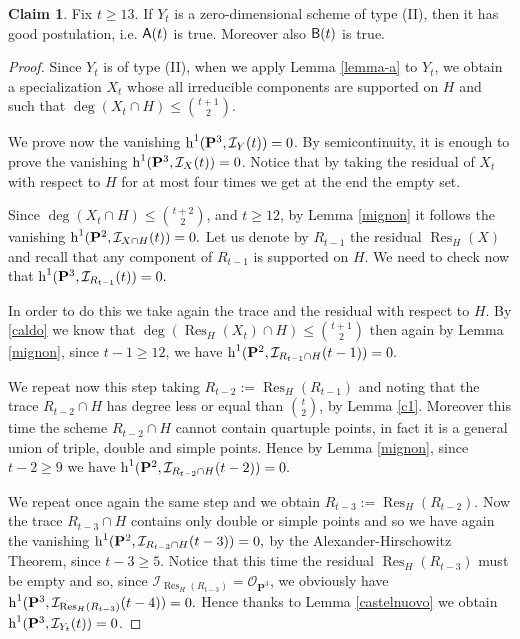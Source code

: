 \documentclass{amsart}
\theoremstyle{plain}
\theoremstyle{definition}
\newtheorem{claim}[theorem]{Claim}
\begin{document}
\begin{claim}\label{claim-a0}
Fix $t\ge13$.
If $Y_t$ is a zero-dimensional scheme of type (II), then
it has good postulation, i.e. ${\sf{{A}}}(t)$ is true.  Moreover also ${\sf{B}}(t)$ is true.
\end{claim}

\begin{proof}
Since $Y_t$ is of type (II),
when we apply Lemma \ref{lemma-a} to $Y_t$, we obtain a
specialization $X_t$ whose all irreducible components are supported on
$H$ and such that $\deg(X_t\cap H)\leq\binom{t+1}{2}$.

We prove now the vanishing $\operatorname{h}^1({\bf{P}}^3,\mathcal {I}_Y(t)) = 0$.
By semicontinuity, it is enough to prove the
vanishing
$\operatorname{h}^1({\bf{P}}^3,\mathcal {I}_X(t)) = 0$.
Notice that by taking the residual of $X_t$ with respect to $H$ for at most
four times we get at the end the empty set.

Since $\deg(X_t\cap H)\le\binom{t+2}{2}$, and $t\ge12$,
by Lemma \ref{mignon} it follows the vanishing
$\operatorname{h}^1({\bf{P}}^2,\mathcal{I}_{X\cap H}(t)) = 0.$
Let us denote by $R_{t-1}$ the residual $\operatorname{Res}_H(X)$ and recall that
any component of $R_{t-1}$ is supported on $H$.
We need to check now that
$\operatorname{h}^1({\bf{P}}^3,\mathcal{I}_{R_{t-1}}(t)) = 0.$

In order to do this
we take again the trace and the residual with respect to $H$.
By \eqref{caldo} we know that
$\deg(\operatorname{Res}_H(X_t)\cap H)\leq\binom{t+1}{2}$
then again by Lemma \ref{mignon}, since $t-1\ge12$, we have
$\operatorname{h}^1({\bf{P}}^2,\mathcal{I}_{R_{t-1}\cap H}(t-1)) = 0.$

We repeat now this step taking $R_{t-2}:=\operatorname{Res}_H(R_{t-1})$ and noting
that the trace $R_{t-2}\cap H$ has degree less or equal than
$\binom{t}{2}$, by Lemma \ref{c1}.
Moreover this time the scheme $R_{t-2}\cap H$ cannot contain quartuple
points,
in fact it is a general union of triple, double and simple points.
Hence by Lemma \ref{mignon}, since $t-2\ge9$ we have
$\operatorname{h}^1({\bf{P}}^2,\mathcal{I}_{R_{t-2}\cap H}(t-2)) = 0.$

We repeat once again the same step and we obtain
$R_{t-3}:=\operatorname{Res}_H(R_{t-2})$. Now the trace ${R_{t-3}\cap H}$ contains
only double or simple points and so we have again the vanishing
$\operatorname{h}^1({\bf{P}}^2,\mathcal{I}_{R_{t-3}\cap H}(t-3)) = 0,$
by the Alexander-Hirschowitz Theorem, since $t-3\ge 5$.
Notice that this time the residual
$\operatorname{Res}_H(R_{t-3})$ must be empty and so, since
$\mathcal{I}_{\operatorname{Res}_H(R_{t-3})}=\mathcal{O}_{{\mathbf P}^3}$, we obviously have
$\operatorname{h}^1({\bf{P}}^3,\mathcal{I}_{\operatorname{Res}_H(R_{t-3})}(t-4)) = 0.$
Hence  thanks to Lemma \ref{castelnuovo} we obtain
$\operatorname{h}^1({\bf{P}}^3,\mathcal {I}_{Y_t}(t)) = 0$.


\end{proof}
\end{document}
